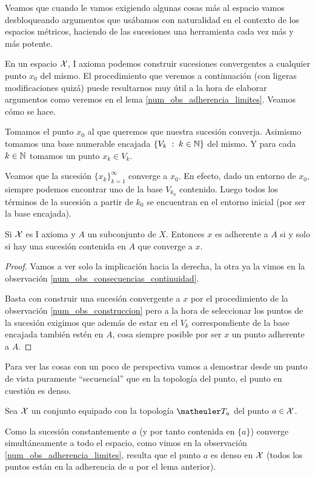 Veamos que cuando le vamos exigiendo algunas cosas más al espacio vamos desbloqueando argumentos que usábamos con naturalidad en el contexto de los espacios métricos, haciendo de las sucesiones una herramienta cada vez más y más potente.
\begin{obs}
	\label{num_obs_construccion}
	En un espacio $\mathcal{X}$, I axioma podemos construir sucesiones convergentes a cualquier punto $x_0$ del mismo. El procedimiento que veremos a continuación (con ligeras modificaciones quizá) puede resultarnos muy útil a la hora de elaborar argumentos como veremos en el lema \ref{num_obs_adherencia_limites}. Veamos cómo se hace.
	
	Tomamos el punto $x_0$ al que queremos que nuestra sucesión converja. Asimismo tomamos una base numerable encajada $\{V_k\;:\; k\in\mathbb{N}\}$ del mismo. Y para cada $k\in\mathbb{N}$ tomamos un punto $x_k\in V_k$.
	
	Veamos que la sucesión $\{x_k\}_{k=1}^{\infty}$ converge a $x_0$. En efecto, dado un entorno de $x_0$, siempre podemos encontrar uno de la base $V_{k_0}$ contenido. Luego todos los términos de la sucesión a partir de $k_0$ se encuentran en el entorno inicial (por ser la base encajada).
\end{obs}
\begin{lem}
	\label{num_obs_adherencia_limites}	
	Si $\mathcal{X}$ es I axioma y $A$ un subconjunto de $X$. Entonces $x$ es adherente a $A$ si y solo si hay una sucesión contenida en $A$ que converge a $x$.
\end{lem}
\begin{proof}
	Vamos a ver solo la implicación hacia la derecha, la otra ya la vimos en la observación \ref{num_obs_consecuencias_continuidad}.
	
	Basta con construir una sucesión convergente a $x$ por el procedimiento de la observación \ref{num_obs_construccion} pero a la hora de seleccionar los puntos de la sucesión exigimos que además de estar en el $V_k$ correspondiente de la base encajada también estén en $A$, cosa siempre posible por ser $x$ un punto adherente a $A$.
\end{proof}

Para ver las cosas con un poco de perspectiva vamos a demostrar desde un punto de vista puramente ``secuencial'' que en la topología del punto, el punto en cuestión es denso.
\begin{exa}
	\label{num_exa_adher_topologia_punto}
	Sea $\mathcal{X}$ un conjunto equipado con la topología $\T_a$ del punto $a\in\mathcal{X}$.
	
	Como la sucesión constantemente $a$ (y por tanto contenida en $\{a\}$) converge simultáneamente a todo el espacio, como vimos en la observación \ref{num_obs_adherencia_limites}, resulta que el punto $a$ es denso en $\mathcal{X}$ (todos los puntos están en la adherencia de $a$ por el lema anterior).
\end{exa}

